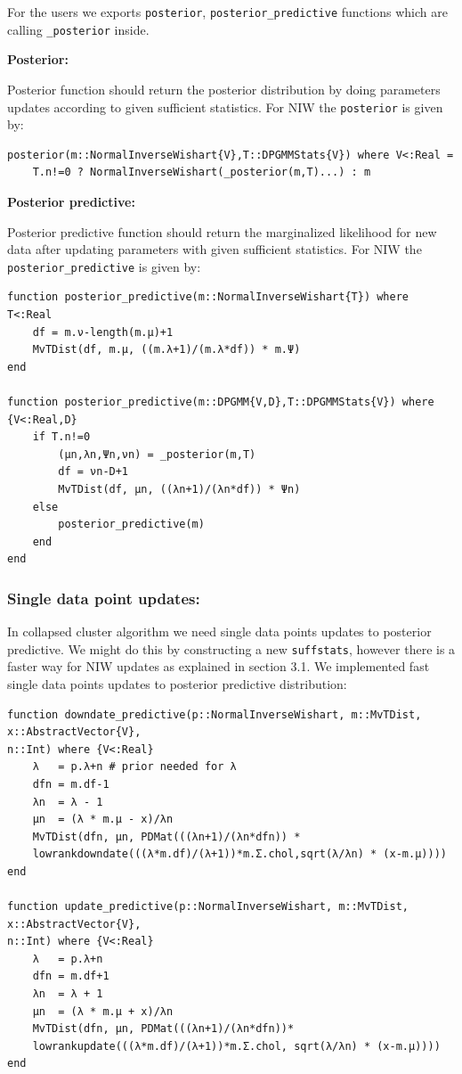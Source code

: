 \documentclass[a4paper]{article}
\begin{document}
For the users we exports \texttt{posterior},
\texttt{posterior\_predictive} functions which are calling
\texttt{\_posterior} inside.

\textbf{Posterior:}

Posterior function should return the posterior distribution by doing
parameters updates according to given sufficient statistics. For NIW the
\texttt{posterior} is given by:
\begin{lstlisting}
posterior(m::NormalInverseWishart{V},T::DPGMMStats{V}) where V<:Real = 
	T.n!=0 ? NormalInverseWishart(_posterior(m,T)...) : m
\end{lstlisting}


\textbf{Posterior predictive:}

Posterior predictive function should return the marginalized likelihood
for new data after updating parameters with given sufficient statistics.
For NIW the \texttt{posterior\_predictive} is given by:

\begin{lstlisting}
function posterior_predictive(m::NormalInverseWishart{T}) where T<:Real
    df = m.ν-length(m.μ)+1
    MvTDist(df, m.μ, ((m.λ+1)/(m.λ*df)) * m.Ψ)
end

function posterior_predictive(m::DPGMM{V,D},T::DPGMMStats{V}) where {V<:Real,D}
    if T.n!=0
        (μn,λn,Ψn,νn) = _posterior(m,T)
        df = νn-D+1
        MvTDist(df, μn, ((λn+1)/(λn*df)) * Ψn)
    else
        posterior_predictive(m)
    end
end
\end{lstlisting}

\subsubsection{Single data point updates:}

In collapsed cluster algorithm we need single data points updates to
posterior predictive. We might do this by constructing a new
\texttt{suffstats}, however there is a faster way for NIW updates as
explained in section 3.1. We implemented fast single data points updates
to posterior predictive distribution:
\begin{lstlisting}[linewidth=17cm]
function downdate_predictive(p::NormalInverseWishart, m::MvTDist, x::AbstractVector{V}, 
n::Int) where {V<:Real}
    λ   = p.λ+n # prior needed for λ
    dfn = m.df-1
    λn  = λ - 1
    μn  = (λ * m.μ - x)/λn
    MvTDist(dfn, μn, PDMat(((λn+1)/(λn*dfn)) * 
    lowrankdowndate(((λ*m.df)/(λ+1))*m.Σ.chol,sqrt(λ/λn) * (x-m.μ))))
end

function update_predictive(p::NormalInverseWishart, m::MvTDist, x::AbstractVector{V}, 
n::Int) where {V<:Real}
    λ   = p.λ+n 
    dfn = m.df+1
    λn  = λ + 1
    μn  = (λ * m.μ + x)/λn
    MvTDist(dfn, μn, PDMat(((λn+1)/(λn*dfn))*
    lowrankupdate(((λ*m.df)/(λ+1))*m.Σ.chol, sqrt(λ/λn) * (x-m.μ))))
end
\end{lstlisting}
\end{document}
